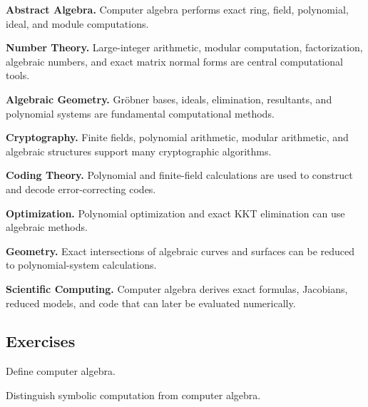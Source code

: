 \begin{applicationbox}

\textbf{Abstract Algebra.}
Computer algebra performs exact ring, field, polynomial, ideal, and module
computations.

\medskip

\textbf{Number Theory.}
Large-integer arithmetic, modular computation, factorization, algebraic
numbers, and exact matrix normal forms are central computational tools.

\medskip

\textbf{Algebraic Geometry.}
Gröbner bases, ideals, elimination, resultants, and polynomial systems are
fundamental computational methods.

\medskip

\textbf{Cryptography.}
Finite fields, polynomial arithmetic, modular arithmetic, and algebraic
structures support many cryptographic algorithms.

\medskip

\textbf{Coding Theory.}
Polynomial and finite-field calculations are used to construct and decode
error-correcting codes.

\medskip

\textbf{Optimization.}
Polynomial optimization and exact KKT elimination can use algebraic
methods.

\medskip

\textbf{Geometry.}
Exact intersections of algebraic curves and surfaces can be reduced to
polynomial-system calculations.

\medskip

\textbf{Scientific Computing.}
Computer algebra derives exact formulas, Jacobians, reduced models, and
code that can later be evaluated numerically.

\end{applicationbox}

\subsection{Exercises}
\label{subsec:computer-algebra-exercises}

\begin{exercise}[1]
Define computer algebra.
\end{exercise}

\begin{exercise}[1]
Distinguish symbolic computation from computer algebra.
\end{exercise}

